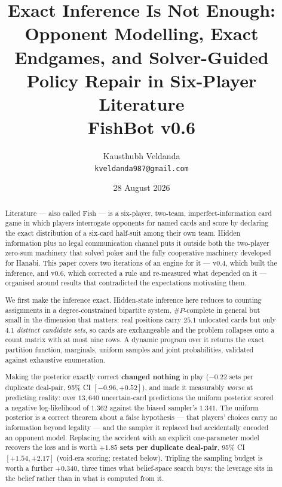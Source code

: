 \documentclass[11pt,a4paper]{article}
\title{\vspace{-1.6cm}\bfseries Exact Inference Is Not Enough:\\[0.1em]
\large Opponent Modelling, Exact Endgames, and Solver-Guided Policy Repair
in Six-Player Literature\\[0.15em]
\normalsize\normalfont FishBot v0.6\vspace{-0.5em}}
\author{\normalsize Kausthubh Veldanda\\[-0.2em]
\small\texttt{kveldanda987@gmail.com}}
\date{\small 28 August 2026\vspace{-0.4em}}
\begin{document}
\maketitle
\vspace{-3.2em}

\begin{abstract}
\small{}\setlength{\parskip}{0pt}\noindent
Literature --- also called Fish --- is a six-player, two-team,
imperfect-information card game in which players interrogate opponents for
named cards and score by declaring the exact distribution of a six-card
half-suit among their own team. Hidden information plus no legal communication
channel puts it outside both the two-player zero-sum machinery that solved
poker and the fully cooperative machinery developed for Hanabi. This paper
covers two iterations of an engine for it --- v0.4, which built the
inference, and v0.6, which corrected a rule and re-measured what depended on
it --- organised around results that contradicted the expectations motivating them.

We first make the inference exact. Hidden-state inference here reduces to counting assignments in a
degree-constrained bipartite system, $\#P$-complete in general but small in the
dimension that matters: real positions carry $25.1$ unlocated cards but only
$4.1$ \emph{distinct candidate sets}, so cards are exchangeable and the problem
collapses onto a count matrix with at most nine rows. A dynamic program over it returns the exact partition function, marginals, uniform samples
and joint probabilities, validated against exhaustive enumeration.

Making the posterior exactly correct \textbf{changed nothing} in play
($-0.22$ sets per duplicate deal-pair, 95\% CI $[-0.96, +0.52]$), and made it
measurably \emph{worse} at predicting reality: over $13{,}640$ uncertain-card predictions the uniform posterior scored a
negative log-likelihood of $1.362$ against the biased sampler's $1.341$. The
uniform posterior is a correct theorem about a false hypothesis --- that
players' choices carry no information beyond legality --- and the sampler it replaced had accidentally encoded an opponent model. Replacing the
accident with an explicit one-parameter model recovers the loss and is worth
$\mathbf{+1.85}$ \textbf{sets per duplicate deal-pair}, 95\% CI
$[+1.54, +2.17]$ (void-era scoring; restated below). Tripling the sampling budget is worth a further $+0.340$, three times what
belief-space search buys: the leverage sits in the belief rather than in what
is computed from it.


\end{abstract}
\end{document}
